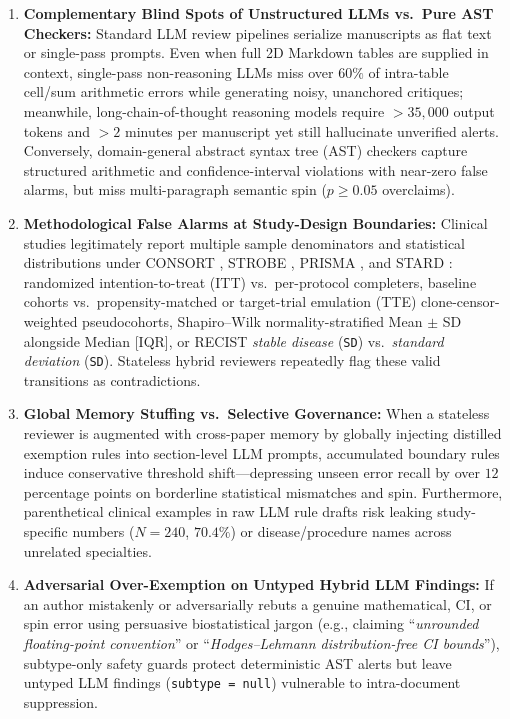 \documentclass[11pt,a4paper]{article}
\begin{document}
\begin{enumerate}[leftmargin=1.5em,itemsep=2pt]
  \item \textbf{Complementary Blind Spots of Unstructured LLMs vs.\ Pure AST Checkers:} Standard LLM review pipelines serialize manuscripts as flat text or single-pass prompts. Even when full 2D Markdown tables are supplied in context, single-pass non-reasoning LLMs miss over $60\%$ of intra-table cell/sum arithmetic errors while generating noisy, unanchored critiques; meanwhile, long-chain-of-thought reasoning models require $>35{,}000$ output tokens and $>2$ minutes per manuscript yet still hallucinate unverified alerts. Conversely, domain-general abstract syntax tree (AST) checkers capture structured arithmetic and confidence-interval violations with near-zero false alarms, but miss multi-paragraph semantic spin ($p \ge 0.05$ overclaims).
  \item \textbf{Methodological False Alarms at Study-Design Boundaries:} Clinical studies legitimately report multiple sample denominators and statistical distributions under CONSORT \cite{schulz2010consort}, STROBE \cite{vandenbroucke2007strobe}, PRISMA \cite{page2021prisma}, and STARD \cite{bossuyt2015stard}: randomized intention-to-treat (ITT) vs.\ per-protocol completers, baseline cohorts vs.\ propensity-matched or target-trial emulation (TTE) clone-censor-weighted pseudocohorts, Shapiro--Wilk normality-stratified Mean $\pm$ SD alongside Median [IQR], or RECIST \emph{stable disease} (\texttt{SD}) vs.\ \emph{standard deviation} (\texttt{SD}). Stateless hybrid reviewers repeatedly flag these valid transitions as contradictions.
  \item \textbf{Global Memory Stuffing vs.\ Selective Governance:} When a stateless reviewer is augmented with cross-paper memory by globally injecting distilled exemption rules into section-level LLM prompts, accumulated boundary rules induce conservative threshold shift---depressing unseen error recall by over $12$ percentage points on borderline statistical mismatches and spin. Furthermore, parenthetical clinical examples in raw LLM rule drafts risk leaking study-specific numbers ($N=240$, $70.4\%$) or disease/procedure names across unrelated specialties.
  \item \textbf{Adversarial Over-Exemption on Untyped Hybrid LLM Findings:} If an author mistakenly or adversarially rebuts a genuine mathematical, CI, or spin error using persuasive biostatistical jargon (e.g., claiming ``\emph{unrounded floating-point convention}'' or ``\emph{Hodges--Lehmann distribution-free CI bounds}''), subtype-only safety guards protect deterministic AST alerts but leave untyped LLM findings (\texttt{subtype = null}) vulnerable to intra-document suppression.
\end{enumerate}
\end{document}
